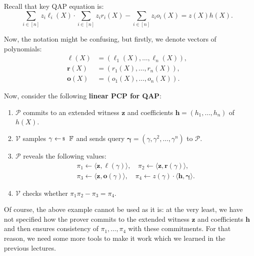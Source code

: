 \documentclass[../lecture-notes-148x210.tex]{subfiles}
\begin{document}
\begin{example}
    Recall that key QAP equation is:
    \begin{equation*}
        \sum_{i \in [n]}z_i\ell_i(X) \cdot \sum_{i \in [n]}z_ir_i(X) - \sum_{i \in [n]}z_io_i(X) = z(X)h(X).
    \end{equation*}

    Now, the notation might be confusing, but firstly, we denote vectors of polynomials: 
    \begin{align*}
        \boldsymbol{\ell}(X) & = (\ell_1(X),\dots,\ell_n(X)), \\
        \boldsymbol{r}(X) & = (r_1(X),\dots,r_n(X)), \\
        \boldsymbol{o}(X) & = (o_1(X),\dots,o_n(X)).
    \end{align*}
    
    Now, consider the following \textbf{linear PCP for QAP}:
    \begin{enumerate}
        \item $\mathcal{P}$ commits to an extended witness $\mathbf{z}$ and
        coefficients $\mathbf{h} = (h_1,\dots,h_n)$ of $h(X)$.
        \item $\mathcal{V}$ samples $\gamma \leftarrowS \mathbb{F}$ and sends
        query $\boldsymbol{\gamma} = (\gamma,\gamma^2,\dots,\gamma^n)$ to
        $\mathcal{P}$.
        \item $\mathcal{P}$ reveals the following values:
        \begin{equation*}
            \begin{aligned}
                &\pi_1 \gets \langle \mathbf{z}, \boldsymbol{\ell}(\gamma) \rangle, \quad \pi_2 \gets \langle \mathbf{z}, \boldsymbol{r}(\gamma) \rangle, \\
                &\pi_3 \gets \langle \mathbf{z}, \boldsymbol{o}(\gamma) \rangle, \quad \pi_4 \gets z(\gamma) \cdot \langle \mathbf{h}, \boldsymbol{\gamma} \rangle.                
            \end{aligned}
        \end{equation*}
        \item $\mathcal{V}$ checks whether $\pi_1\pi_2 - \pi_3 = \pi_4$.
    \end{enumerate}
\end{example}

Of course, the above example cannot be used as it is: at the very least, we have not specified how the prover commits to the extended witness $\mathbf{z}$ and coefficients $\mathbf{h}$ and then ensures consistency of $\pi_1,\dots,\pi_4$ with these commitments. For that reason, we need some more tools to make it work which we learned in the previous lectures.
\end{document}
